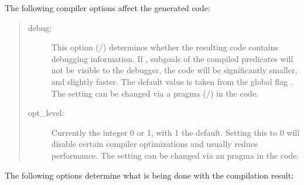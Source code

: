 The following compiler options affect the generated code:
\begin{quote}
\begin{description}
\item[debug:]
    This option (/) determines whether the resulting
    code
    contains
    debugging information.  If , subgoals of the compiled
    predicates
    will
    not be visible to the debugger, the code will be significantly smaller,
    and slightly faster.
    The default value is taken from the global flag .
    The setting can be changed via a pragma
    (/) in the code.

\item[opt_level:]
    Currently the integer 0 or 1, with 1 the default. Setting this to 0
    will disable certain compiler optimizations and usually reduce performance.
    The setting can be changed via an  pragma in the
    code.
\end{description}
\end{quote}
The following options determine what is being done with the compilation result:
